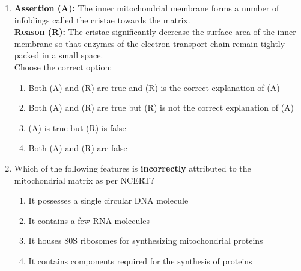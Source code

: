 \documentclass[11pt, a4paper]{article}
\begin{document}
\begin{enumerate}[label=\textbf{\arabic*.}, leftmargin=*, itemsep=8pt]
    \item \textbf{Assertion (A):} The inner mitochondrial membrane forms a number of infoldings called the cristae towards the matrix.\\
    \textbf{Reason (R):} The cristae significantly decrease the surface area of the inner membrane so that enzymes of the electron transport chain remain tightly packed in a small space.\\
    Choose the correct option:
    \begin{enumerate}[label=(\alph*)]
        \item Both (A) and (R) are true and (R) is the correct explanation of (A)
        \item Both (A) and (R) are true but (R) is not the correct explanation of (A)
        \item (A) is true but (R) is false
        \item Both (A) and (R) are false
    \end{enumerate}

    \item Which of the following features is \textbf{incorrectly} attributed to the mitochondrial matrix as per NCERT?
    \begin{enumerate}[label=(\alph*)]
        \item It possesses a single circular DNA molecule
        \item It contains a few RNA molecules
        \item It houses $80\text{S}$ ribosomes for synthesizing mitochondrial proteins
        \item It contains components required for the synthesis of proteins
    \end{enumerate}


\end{enumerate}
\end{document}

